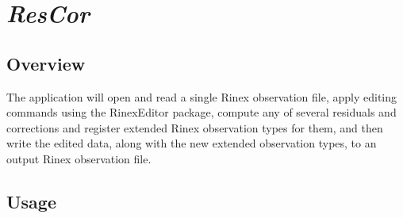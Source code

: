 %
%

\section{\emph{ResCor}}
\subsection{Overview}
The application will open and read a single Rinex observation file, apply editing commands
   using the RinexEditor package, compute any of several residuals and corrections and
   register extended Rinex observation types for them, and then write the edited data,
   along with the new extended observation types, to an output Rinex observation file.

\subsection{Usage}

